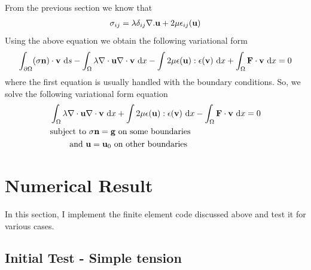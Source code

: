 %
From the previous section we know that
%
\begin{align}
  \sigma_{ij} = \lambda \delta _{ij} \nabla . \mathbf{u} + 2\mu \epsilon _{ij} (\mathbf{u}) 
\end{align}
%
Using the above equation we obtain the following variational form
%
\begin{align}
      \int_{\partial \Omega} (\sigma \mathbf{n})\cdot \mathbf{v} ~\text{d} s - \int_{\Omega} \lambda \nabla \cdot \mathbf{u} \nabla \cdot \mathbf{v} ~ \text{d} x  - \int 2\mu \epsilon (\mathbf{u}) : \epsilon (\mathbf{v}) ~ \text{d} x+ \int_{\Omega} \mathbf{F} \cdot \mathbf{v} ~\text{d} x = 0
\end{align}
%
where the first equation is usually handled with the boundary
conditions. So, we solve the following variational form equation
%
\begin{align}
  & \int_{\Omega} \lambda \nabla \cdot \mathbf{u} \nabla \cdot \mathbf{v} ~ \text{d} x  + \int 2\mu \epsilon (\mathbf{u}) : \epsilon (\mathbf{v}) ~ \text{d} x - \int_{\Omega} \mathbf{F} \cdot \mathbf{v} ~\text{d} x = 0\\
  & \text{subject to } \sigma \mathbf{n} = \mathbf{g} \text{ on some
  boundaries } \nonumber\\
  & \qquad \text{ and  } \mathbf{u} = \mathbf{u}_0 \text{ on other boundaries}
\end{align}



\section{Numerical Result}

In this section, I implement the finite element code discussed above
and test it for various cases.

\subsection{Initial Test - Simple tension}

